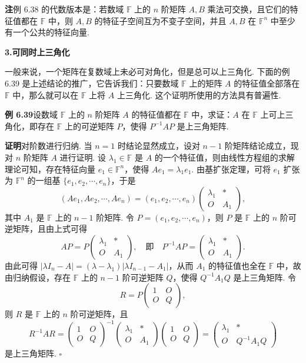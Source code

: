\documentclass[UTF8,12pt,a4paper,fontset=fandol]{ctexart}
\begin{document}
\noindent\textbf{注}\quad 例 6.38 的代数版本是：若数域 $\mathbb{F}$ 上的 $n$ 阶矩阵 $A,B$ 乘法可交换，且它们的特征值都在 $\mathbb{F}$ 中，则 $A,B$ 的特征子空间互为不变子空间，并且 $A,B$ 在 $\mathbb{F}^n$ 中至少有一个公共的特征向量.

\noindent\textbf{3.\quad 可同时上三角化}

一般来说，一个矩阵在复数域上未必可对角化，但是总可以上三角化. 下面的例 6.39 是上述结论的推广，它告诉我们：只要数域 $\mathbb{F}$ 上的矩阵 $A$ 的特征值全部落在 $\mathbb{F}$ 中，那么就可以在 $\mathbb{F}$ 上将 $A$ 上三角化. 这个证明所使用的方法具有普遍性.

\noindent\textbf{例 6.39}\quad 设数域 $\mathbb{F}$ 上的 $n$ 阶矩阵 $A$ 的特征值都在 $\mathbb{F}$ 中，求证：$A$ 在 $\mathbb{F}$ 上可上三角化，即存在 $\mathbb{F}$ 上的可逆矩阵 $P$，使得 $P^{-1}AP$ 是上三角矩阵.

\noindent\textbf{证明}\quad 对阶数进行归纳. 当 $n=1$ 时结论显然成立，设对 $n-1$ 阶矩阵结论成立，现对 $n$ 阶矩阵 $A$ 进行证明. 设 $\lambda_1\in\mathbb{F}$ 是 $A$ 的一个特征值，则由线性方程组的求解理论可知，存在特征向量 $e_1\in\mathbb{F}^n$，使得 $Ae_1=\lambda_1e_1$. 由基扩张定理，可将 $e_1$ 扩张为 $\mathbb{F}^n$ 的一组基 $\{e_1,e_2,\cdots,e_n\}$，于是
\[
(Ae_1,Ae_2,\cdots,Ae_n)=(e_1,e_2,\cdots,e_n)
\left(\begin{array}{cc}
\lambda_1 & *\\
O & A_1
\end{array}\right),
\]
其中 $A_1$ 是 $\mathbb{F}$ 上的 $n-1$ 阶矩阵. 令 $P=(e_1,e_2,\cdots,e_n)$，则 $P$ 是 $\mathbb{F}$ 上的 $n$ 阶可逆矩阵，且由上式可得
\[
AP=P\left(\begin{array}{cc}
\lambda_1 & *\\
O & A_1
\end{array}\right),
\quad\text{即}\quad
P^{-1}AP=\left(\begin{array}{cc}
\lambda_1 & *\\
O & A_1
\end{array}\right).
\]
由此可得 $|\lambda I_n-A|=(\lambda-\lambda_1)|\lambda I_{n-1}-A_1|$，从而 $A_1$ 的特征值也全在 $\mathbb{F}$ 中，故由归纳假设，存在 $\mathbb{F}$ 上的 $n-1$ 阶可逆矩阵 $Q$，使得 $Q^{-1}A_1Q$ 是上三角矩阵. 令
\[
R=P\left(\begin{array}{cc}
1 & O\\
O & Q
\end{array}\right),
\]
则 $R$ 是 $\mathbb{F}$ 上的 $n$ 阶可逆矩阵，且
\[
R^{-1}AR=
\left(\begin{array}{cc}
1 & O\\
O & Q
\end{array}\right)^{-1}
\left(\begin{array}{cc}
\lambda_1 & *\\
O & A_1
\end{array}\right)
\left(\begin{array}{cc}
1 & O\\
O & Q
\end{array}\right)
=\left(\begin{array}{cc}
\lambda_1 & *\\
O & Q^{-1}A_1Q
\end{array}\right)
\]
是上三角矩阵. $\square$
\end{document}
